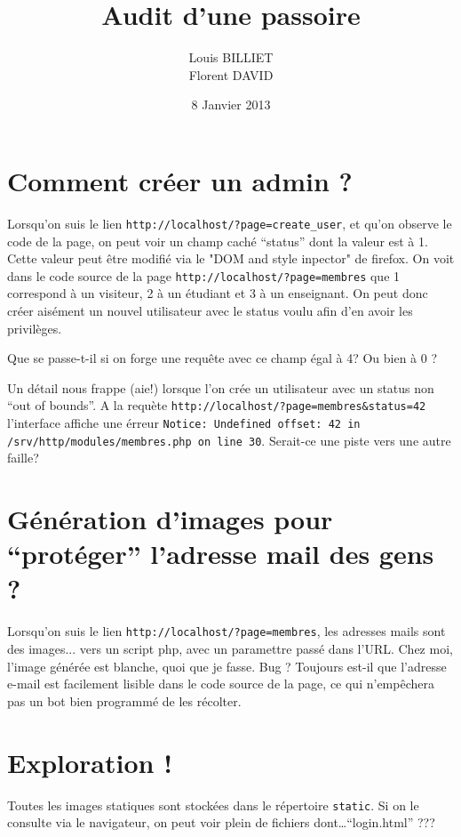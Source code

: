 \documentclass[oneside,10pt]{article}
\begin{document}
\title{Audit d'une passoire}
\author{Louis BILLIET \\ Florent DAVID}
\date{8 Janvier 2013}
\maketitle

\section{Comment cr\'eer un admin ?}
Lorsqu'on suis le lien \verb+http://localhost/?page=create_user+, et qu'on observe le code de la page, on peut voir un champ cach\'e ``status'' dont la valeur est \`a 1.
Cette valeur peut \^etre modifi\'e via le "DOM and style inpector" de firefox.
On voit dans le code source de la page \verb+http://localhost/?page=membres+ que 1 correspond \`a un visiteur, 2 \`a un \'etudiant et 3 \`a un enseignant.
On peut donc cr\'eer ais\'ement un nouvel utilisateur avec le status voulu afin d'en avoir les privil\`eges.

Que se passe-t-il si on forge une requ\^ete avec ce champ \'egal \`a 4? Ou bien \`a 0 ?

Un d\'etail nous frappe (aie!) lorsque l'on cr\'ee un utilisateur avec un status non ``out of bounds''. A la requ\`ete \verb+http://localhost/?page=membres&status=42+ 
\\l'interface affiche une \'erreur \verb+Notice: Undefined offset: 42 in /srv/http/modules/membres.php on line 30+.
Serait-ce une piste vers une autre faille?

\section{G\'en\'eration d'images pour ``prot\'eger'' l'adresse mail des gens ?}
Lorsqu'on suis le lien \verb+http://localhost/?page=membres+, les adresses mails sont des images... vers un script php, avec un paramettre pass\'e dans l'URL.
Chez moi, l'image g\'en\'er\'ee est blanche, quoi que je fasse. Bug ?
Toujours est-il que l'adresse e-mail est facilement lisible dans le code source de la page, ce qui n'emp\^echera pas un bot bien programm\'e de les r\'ecolter.

\section{Exploration !}
Toutes les images statiques sont stock\'ees dans le r\'epertoire \verb+static+.
Si on le consulte via le navigateur, on peut voir plein de fichiers dont\ldots ``login.html'' ???
\end{document}
